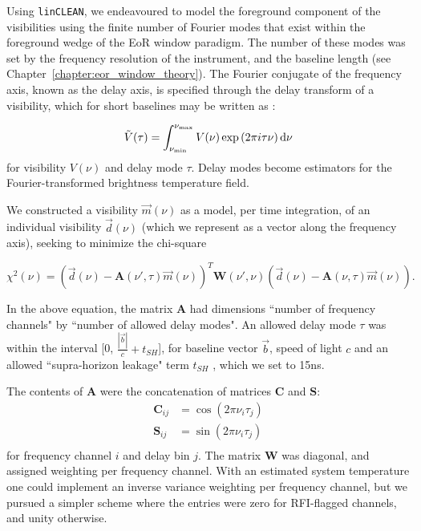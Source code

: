 Using {\tt linCLEAN}, we endeavoured to model the foreground component of the visibilities using the finite number of Fourier modes that exist within the foreground wedge of the EoR window paradigm. The number of these modes was set by the frequency resolution of the instrument, and the baseline length (see Chapter~\ref{chapter:eor_window_theory}).
The Fourier conjugate of the frequency axis, known as the delay axis, is specified through the delay transform of a visibility, which for short baselines may be written as \citep{Parsons.12b}:

\begin{equation}
\tilde{V}(\tau) = \int^{\nu_{\rm max}}_{\nu_{\rm min}} V(\nu) \exp\left(2\pi i \tau \nu\right) {\rm d}\nu
\end{equation}
for visibility $V(\nu)$ and delay mode $\tau$. Delay modes become estimators for the Fourier-transformed brightness temperature field.

We constructed a visibility $\vec{m}(\nu)$ as a model, per time integration, of an individual visibility $\vec{d}(\nu)$ (which we represent as a vector along the frequency axis), seeking to minimize the chi-square

\begin{equation}
\chi^2(\nu) = (\vec{d}(\nu) - \textbf{A}(\nu',\tau)\vec{m}(\nu))^T \textbf{W}(\nu',\nu)(\vec{d}(\nu) - \textbf{A}(\nu,\tau)\vec{m}(\nu)).
\label{eq:linclean_chisquare}
\end{equation}

In the above equation, the matrix $\textbf{A}$ had dimensions ``number of frequency channels" by ``number of allowed delay modes". An allowed delay mode $\tau$ was within the interval [0,  $\frac{|\vec{b}|}{c} + t_{SH}$], for baseline vector $\vec{b}$, speed of light $c$ and an allowed ``supra-horizon leakage" term $t_{SH}$ \citep{Pober.13}, which we set to 15ns.

The contents of $\textbf{A}$ were the concatenation of matrices $\textbf{C}$ and  $\textbf{S}$:
\begin{eqnarray}
\textbf{C}_{ij} &=  \cos(2\pi \nu_i \tau_j)\\
\textbf{S}_{ij} &=  \sin(2\pi \nu_i \tau_j)\\
\end{eqnarray}
for frequency channel $i$ and delay bin $j$.
The matrix $\textbf{W}$ was diagonal, and assigned weighting per frequency channel. With an estimated system temperature one could implement an inverse variance weighting per frequency channel, but we pursued a simpler scheme where the entries were zero for RFI-flagged channels, and unity otherwise.


